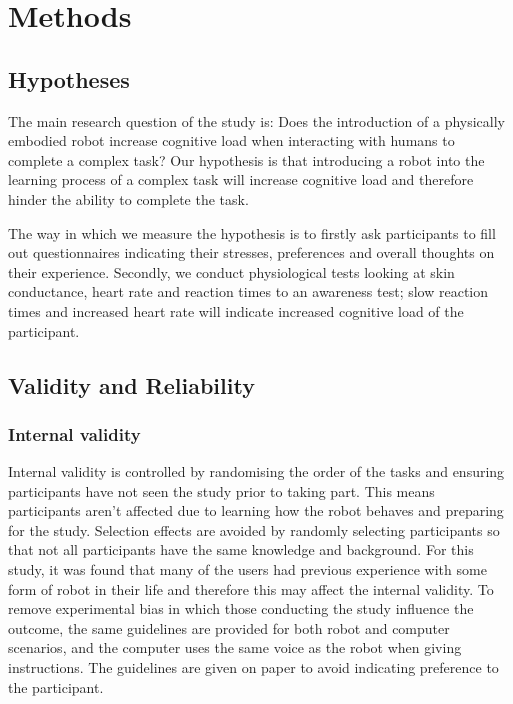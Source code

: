\documentclass[conference]{IEEEtran}
\begin{document}
\section{Methods}

\subsection{Hypotheses}
The main research question of the study is: Does the introduction of a physically embodied robot increase cognitive load when interacting with humans to complete a complex task? Our hypothesis is that introducing a robot into the learning process of a complex task will increase cognitive load and therefore hinder the ability to complete the task.

The way in which we measure the hypothesis is to firstly ask participants to fill out questionnaires indicating their stresses, preferences and overall thoughts on their experience. Secondly, we conduct physiological tests looking at skin conductance, heart rate and reaction times to an awareness test; slow reaction times and increased heart rate will indicate increased cognitive load of the participant. 

\subsection{Validity and  Reliability}

\subsubsection{Internal validity} 
Internal validity is controlled by randomising the order of the tasks and ensuring participants have not seen the study prior to taking part. This means participants aren't affected due to learning how the robot behaves and preparing for the study. Selection effects are avoided by randomly selecting participants so that not all participants have the same knowledge and background. For this study, it was found that many of the users had previous experience with some form of robot in their life and therefore this may affect the internal validity. To remove experimental bias in which those conducting the study influence the outcome, the same guidelines are provided for both robot and computer scenarios, and the computer uses the same voice as the robot when giving instructions. The guidelines are given on paper to avoid indicating preference to the participant.
\end{document}
